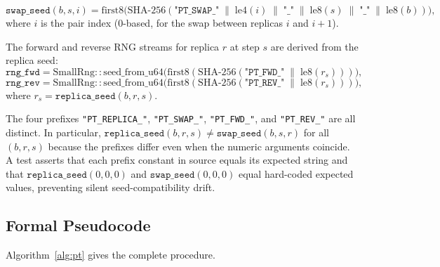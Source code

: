 \begin{definition}
\label{def:swap-seed}
\[
  \mathtt{swap\_seed}(b, s, i) =
  \mathrm{first8}\bigl(\mathrm{SHA\text{-}256}(
    \texttt{"PT\_SWAP\_"} \;\|\;
    \mathrm{le4}(i) \;\|\;
    \texttt{"\_"} \;\|\;
    \mathrm{le8}(s) \;\|\;
    \texttt{"\_"} \;\|\;
    \mathrm{le8}(b)
  )\bigr),
\]
where $i$ is the pair index (0-based, for the swap between replicas $i$ and $i+1$).
\end{definition}

The forward and reverse RNG streams for replica $r$ at step $s$ are derived
from the replica seed:
\[
  \mathtt{rng\_fwd} = \mathrm{SmallRng::seed\_from\_u64}\!\bigl(
    \mathrm{first8}(\mathrm{SHA\text{-}256}(\texttt{"PT\_FWD\_"} \;\|\; \mathrm{le8}(r_s)))
  \bigr),
\]
\[
  \mathtt{rng\_rev} = \mathrm{SmallRng::seed\_from\_u64}\!\bigl(
    \mathrm{first8}(\mathrm{SHA\text{-}256}(\texttt{"PT\_REV\_"} \;\|\; \mathrm{le8}(r_s)))
  \bigr),
\]
where $r_s = \mathtt{replica\_seed}(b, r, s)$.

\begin{remark}
The four prefixes \texttt{"PT\_REPLICA\_"}, \texttt{"PT\_SWAP\_"},
\texttt{"PT\_FWD\_"}, and \texttt{"PT\_REV\_"} are all distinct.
In particular, $\mathtt{replica\_seed}(b, r, s) \ne \mathtt{swap\_seed}(b, s, r)$
for all $(b, r, s)$ because the prefixes differ even when the numeric arguments
coincide.
A test asserts that each prefix constant in source equals its expected string
and that $\mathtt{replica\_seed}(0, 0, 0)$ and $\mathtt{swap\_seed}(0, 0, 0)$
equal hard-coded expected values, preventing silent seed-compatibility drift.
\end{remark}

\subsection{Formal Pseudocode}

Algorithm~\ref{alg:pt} gives the complete \pt{} procedure.


